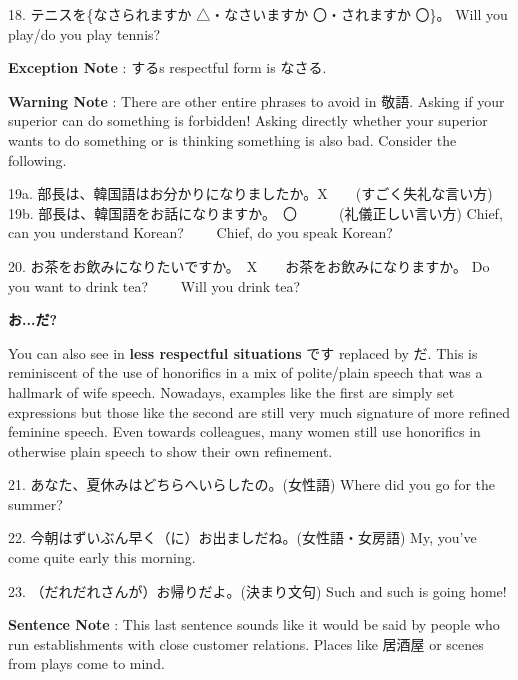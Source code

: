 \par{18. テニスを\{なさられますか △・なさいますか 〇・されますか 〇\}。 \hfill\break
Will you play\slash do you play tennis? }

\par{\textbf{Exception Note }: する\textquotesingle s respectful form is なさる. }

\par{\textbf{Warning Note }: There are other entire phrases to avoid in 敬語. Asking if your superior can do something is forbidden! Asking directly whether your superior wants to do something or is thinking something is also bad. Consider the following. }

\par{19a. 部長は、韓国語はお分かりになりましたか。X　　(すごく失礼な言い方) \hfill\break
19b. 部長は、韓国語をお話になりますか。　〇　　　(礼儀正しい言い方) \hfill\break
Chief, can you understand Korean? 　\textrightarrow 　Chief, do you speak Korean? }

\par{20. お茶をお飲みになりたいですか。　X　\textrightarrow 　お茶をお飲みになりますか。 \hfill\break
Do you want to drink tea? \textrightarrow 　　Will you drink tea? }

\begin{center}
 \textbf{お\dothyp{}\dothyp{}\dothyp{}だ? }
\end{center}

\par{ You can also see in \textbf{less respectful situations }です replaced by だ. This is reminiscent of the use of honorifics in a mix of polite\slash plain speech that was a hallmark of wife speech. Nowadays, examples like the first are simply set expressions but those like the second are still very much signature of more refined feminine speech. Even towards colleagues, many women still use honorifics in otherwise plain speech to show their own refinement. }

\par{21. あなた、夏休みはどちらへいらしたの。(女性語) \hfill\break
Where did you go for the summer? }

\par{22. 今朝はずいぶん早く（に）お出ましだね。(女性語・女房語) \hfill\break
My, you've come quite early this morning. }

\par{23. （だれだれさんが）お帰りだよ。(決まり文句) \hfill\break
Such and such is going home! }

\par{\textbf{Sentence Note }: This last sentence sounds like it would be said by people who run establishments with close customer relations. Places like 居酒屋 or scenes from plays come to mind. }

